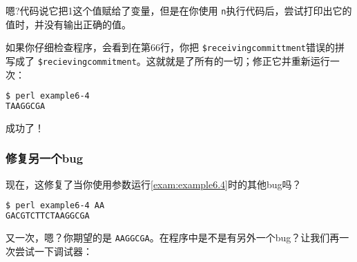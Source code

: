 嗯?代码说它把1这个值赋给了变量，但是在你使用 \verb|n|执行代码后，尝试打印出它的值时，并没有输出正确的值。

如果你仔细检查程序，会看到在第66行，你把 \verb|$receivingcommittment|错误的拼写成了 \verb|$recievingcommitment|。这就就是了所有的一切；修正它并重新运行一次：

\begin{lstlisting}[language=bash]
$ perl example6-4
TAAGGCGA 
\end{lstlisting}

成功了！

\subsubsection{修复另一个bug}
现在，这修复了当你使用参数运行\autoref{exam:example6.4}时的其他bug吗？

\begin{lstlisting}[language=bash]
$ perl example6-4 AA
GACGTCTTCTAAGGCGA
\end{lstlisting}

又一次，嗯？你期望的是 \verb|AAGGCGA|。在程序中是不是有另外一个bug？让我们再一次尝试一下调试器：

